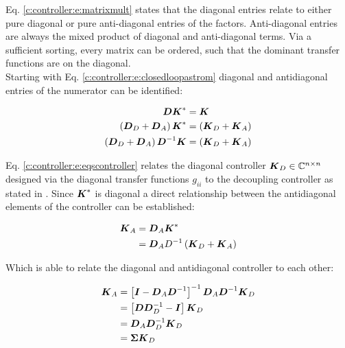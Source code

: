 Eq. \ref{c:controller:e:matrixmult} states that the diagonal entries relate to either pure diagonal or pure anti-diagonal entries of the factors. Anti-diagonal entries are always the mixed product of diagonal and anti-diagonal terms. Via a sufficient sorting, every matrix can be ordered, such that the dominant transfer functions are on the diagonal.\\

Starting with Eq. \ref{c:controller:e:closedloopastrom} diagonal and antidiagonal entries of the numerator can be identified:

\begin{align}
\begin{split}
\mbox{\boldmath$D$}\mbox{\boldmath$K$}^* &= \mbox{\boldmath$K$} \\
\left(\mbox{\boldmath$D$}_D + \mbox{\boldmath$D$}_A \right) \mbox{\boldmath$K$}^* &= \left(\mbox{\boldmath$K$}_D + \mbox{\boldmath$K$}_A \right)\\
\left(\mbox{\boldmath$D$}_D + \mbox{\boldmath$D$}_A \right) \mbox{\boldmath$D$}^{-1} \mbox{\boldmath$K$} &= \left(\mbox{\boldmath$K$}_D + \mbox{\boldmath$K$}_A \right)
\end{split}
\label{c:controller:e:eqscontroller}
\end{align}

Eq. \ref{c:controller:e:eqscontroller} relates the diagonal controller $\mbox{\boldmath$K$}_D \in \mathbb{C}^{n \times n}$ designed via the diagonal transfer functions $g_{ii}$ to the decoupling controller as stated in \cite{Astrom2001a} . Since $\mbox{\boldmath$K$}^{*}$ is diagonal a direct relationship between the antidiagonal elements of the controller can be established:

\begin{align*}
\begin{split}
\mbox{\boldmath$K$}_A &= \mbox{\boldmath$D$}_A \mbox{\boldmath$K$}^* \\
&= \mbox{\boldmath$D$}_A D^{-1} \left( \mbox{\boldmath$K$}_D + \mbox{\boldmath$K$}_A \right) \\
\end{split}
\end{align*}

Which is able to relate the diagonal and antidiagonal controller to each other:

\begin{align}
\begin{split}
\mbox{\boldmath$K$}_A &= \left[ \mbox{\boldmath$I$} - \mbox{\boldmath$D$}_A \mbox{\boldmath$D$}^{-1} \right]^{-1} \mbox{\boldmath$D$}_A \mbox{\boldmath$D$}^{-1} \mbox{\boldmath$K$}_D \\
&= \left[\mbox{\boldmath$D$} \mbox{\boldmath$D$}_D^{-1} - \mbox{\boldmath$I$} \right] \mbox{\boldmath$K$}_D \\
&= \mbox{\boldmath$D$}_A \mbox{\boldmath$D$}_D^{-1} \mbox{\boldmath$K$}_D \\
&= \mbox{\boldmath$\Sigma$} \mbox{\boldmath$K$}_D
\end{split}
\label{c:controller:e:splitter}
\end{align}

